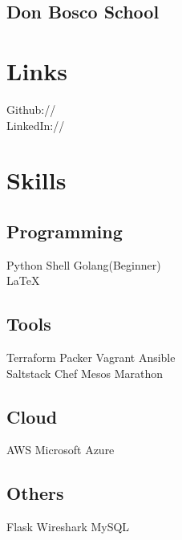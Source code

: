\documentclass[]{deedy-resume-openfont}
\begin{document}
\begin{minipage}[t]{0.33\textwidth}
\subsection{Don Bosco School}
\sectionsep


\section{Links}
Github:// \href{https://github.com/nabarunchatterjee}{} \\
\sectionsep
LinkedIn://  \href{https://www.linkedin.com/in/nabarunchatterjee}{} \\
\sectionsep



\section{Skills}
\subsection{Programming}
Python \textbullet{}   Shell \textbullet{} Golang(Beginner) \\
\textbullet{} \LaTeX\ \\
\sectionsep
\subsection{Tools}
Terraform \textbullet{} Packer \textbullet{} Vagrant \textbullet{} Ansible \\
\textbullet{} Saltstack  \textbullet{} Chef \textbullet{} Mesos Marathon\\
\sectionsep
\subsection{Cloud}
AWS \textbullet{} Microsoft Azure\\
\sectionsep
\subsection{Others}
Flask \textbullet{} Wireshark \textbullet{} MySQL
\sectionsep


\end{minipage}
\end{document}
